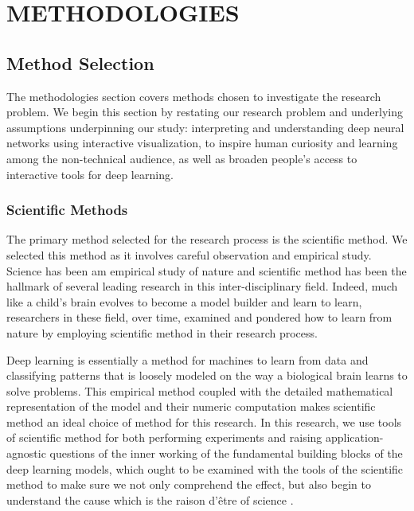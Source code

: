 \chapter{METHODOLOGIES}

\graphicspath{ {./methodologies/} }
\thispagestyle{empty}


\section{Method Selection}

The methodologies section covers methods chosen to investigate the research problem. We begin this section by restating our research problem and underlying assumptions underpinning our study: interpreting and understanding deep neural networks using interactive visualization, to inspire human curiosity and learning among the non-technical audience, as well as broaden people's access to interactive tools for deep learning.

\subsection{Scientific Methods}

The primary method selected for the research process is the scientific method. We selected this method as it involves careful observation and empirical study. Science has been am empirical study of nature and scientific method has been the hallmark of several leading research in this inter-disciplinary field. Indeed, much like a child’s brain evolves to become a model builder and learn to learn, researchers in these field, over time, examined and pondered how to learn from nature by employing scientific method in their research process. 


Deep learning is essentially a method for machines to learn from data and classifying patterns that is loosely modeled on the way a biological brain learns to solve problems. This empirical method coupled with the detailed mathematical representation of the model and their numeric computation makes scientific method an ideal choice of method for this research. In this research, we use tools of scientific method for both performing experiments and raising application-agnostic questions of the inner working of the fundamental building blocks of the deep learning models, which ought to be examined with the tools of the scientific method to make sure we not only comprehend the effect, but also begin to understand the cause which is the raison d'\^{e}tre of science \cite{edsarx.1904.1092220190101}.

